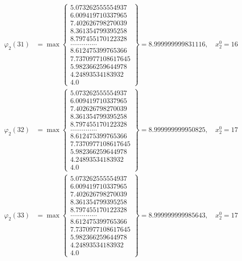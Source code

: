 \documentclass{article}
\begin{document}
\begin{align*}
  
  
  
\varphi_{2}(31) &= \max \left\{ \begin{array}{c}
5.073262555554937 \\
 6.009419710337965 \\
 7.402626798270039 \\
 8.361354799395258 \\
 8.797455170122328 \\
 .............. \\
 8.612475399765366 \\
 7.7370977108617645 \\
 5.982366259644978 \\
 4.24893534183932 \\
 4.0
\end{array} \right\} = 8.999999999831116, \quad x_{2}^0 = 16\\
  
  
  
  
\varphi_{2}(32) &= \max \left\{ \begin{array}{c}
5.073262555554937 \\
 6.009419710337965 \\
 7.402626798270039 \\
 8.361354799395258 \\
 8.797455170122328 \\
 .............. \\
 8.612475399765366 \\
 7.7370977108617645 \\
 5.982366259644978 \\
 4.24893534183932 \\
 4.0
\end{array} \right\} = 8.999999999950825, \quad x_{2}^0 = 17\\
  
  
  
  
\varphi_{2}(33) &= \max \left\{ \begin{array}{c}
5.073262555554937 \\
 6.009419710337965 \\
 7.402626798270039 \\
 8.361354799395258 \\
 8.797455170122328 \\
 .............. \\
 8.612475399765366 \\
 7.7370977108617645 \\
 5.982366259644978 \\
 4.24893534183932 \\
 4.0
\end{array} \right\} = 8.999999999985643, \quad x_{2}^0 = 17\\
  

\end{align*}
\end{document}
